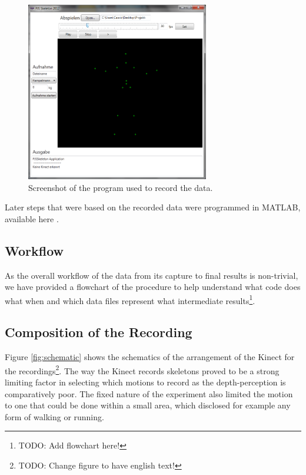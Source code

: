 \documentclass[a4paper]{article}
\begin{document}
\begin{figure}[H]
	\centering
	\includegraphics[width=8cm]{programm.jpg}
	\caption{Screenshot of the program used to record the data.}
	\label{fig:programm}
\end{figure}

Later steps that were based on the recorded data were programmed in MATLAB, available here \cite{matlabprograms}.

\subsection{Workflow}

As the overall workflow of the data from its capture to final results is non-trivial, we have provided a flowchart of the procedure to help understand what code does what when and which data files represent what intermediate results\footnote{TODO: Add flowchart here!}.

\subsection{Composition of the Recording}

Figure \ref{fig:schematic} shows the schematics of the arrangement of the Kinect for the recordings\footnote{TODO: Change figure to have english text!}.
The way the Kinect records skeletons proved to be a strong limiting factor in selecting which motions to record as the depth-perception is comparatively poor.
The fixed nature of the experiment also limited the motion to one that could be done within a small area, which disclosed for example any form of walking or running.
\end{document}
